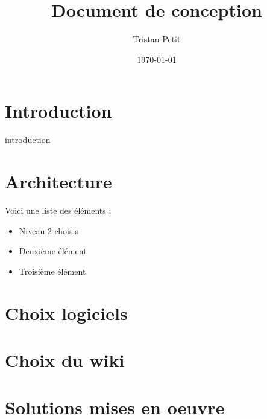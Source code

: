 \documentclass{article}
\begin{document}
\title{Document de conception}
\author{Tristan Petit}
\date{\today}
\maketitle

\section{Introduction}

{introduction}

\section{Architecture}
Voici une liste des éléments :
\begin{itemize}
    \item Niveau 2 choisis
    \item Deuxième élément
    \item Troisième élément
\end{itemize}

\section{Choix logiciels}


\section{Choix du wiki}


\section{Solutions mises en oeuvre}
\end{document}
